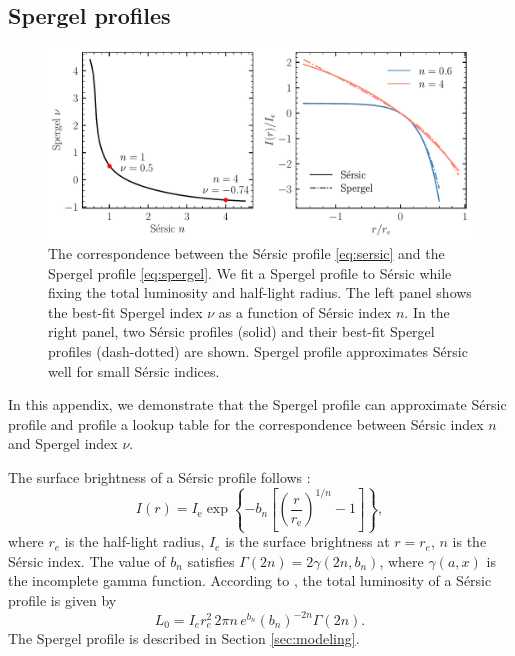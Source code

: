 \documentclass[twocolumn,astrosymb,twocolappendix]{aastex631}
\newcommand{\sersic}{S\'ersic}
\begin{document}
\begin{CJK*}{UTF8}{gbsn}
\section{Spergel profiles}\label{ap:spergel}
\begin{figure}[htbp!]
	\vbox{ 
		\centering
		\includegraphics[width=0.75\linewidth]{spergel_sersic_calib.pdf}
	}
    \caption{The correspondence between the \sersic{} profile \eqref{eq:sersic} and the Spergel profile \eqref{eq:spergel}. We fit a Spergel profile to \sersic{} while fixing the total luminosity and half-light radius. The left panel shows the best-fit Spergel index $\nu$ as a function of \sersic{} index $n$. In the right panel, two \sersic{} profiles (solid) and their best-fit Spergel profiles (dash-dotted) are shown. Spergel profile approximates \sersic{} well for small \sersic{} indices.  
    }
    \label{fig:spgl_calib}
\end{figure}

In this appendix, we demonstrate that the Spergel profile can approximate \sersic{} profile and profile a lookup table for the correspondence between \sersic{} index $n$ and Spergel index $\nu$.

The surface brightness of a \sersic{} profile follows \citep{Sersic1963,Graham2005}:
\begin{equation}\label{eq:sersic}
    I(r)=I_{\mathrm{e}} \exp \left\{-b_{n}\left[\left(\frac{r}{r_{\mathrm{e}}}\right)^{1 / n}-1\right]\right\},
\end{equation}
where $r_e$ is the half-light radius, $I_e$ is the surface brightness at $r=r_e$, $n$ is the \sersic{} index. The value of $b_n$ satisfies $\Gamma(2 n)=2 \gamma\left(2 n, b_{n}\right)$, where $\gamma(a, x)$ is the incomplete gamma function. According to \citet{Graham2005}, the total luminosity of a \sersic{} profile is given by 
\begin{equation}\label{eq:sersic_lum}
    L_0 = I_{e} r_{e}^{2}\, 2 \pi n\, e^{b_{n}} \left(b_{n}\right)^{-2 n} \Gamma(2 n).
\end{equation}
The Spergel profile is described in Section \ref{sec:modeling}. 


\end{CJK*}
\end{document}
